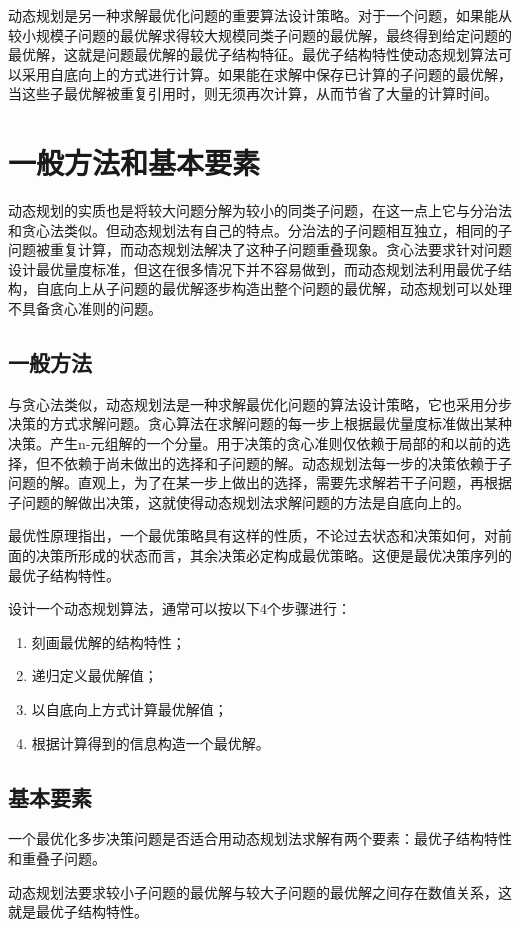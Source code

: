 动态规划是另一种求解最优化问题的重要算法设计策略。对于一个问题，如果能从较小规模子问题的最优解求得较大规模同类子问题的最优解，最终得到给定问题的最优解，这就是问题最优解的最优子结构特征。最优子结构特性使动态规划算法可以采用自底向上的方式进行计算。如果能在求解中保存已计算的子问题的最优解，当这些子最优解被重复引用时，则无须再次计算，从而节省了大量的计算时间。
\section{一般方法和基本要素}
动态规划的实质也是将较大问题分解为较小的同类子问题，在这一点上它与分治法和贪心法类似。但动态规划法有自己的特点。分治法的子问题相互独立，相同的子问题被重复计算，而动态规划法解决了这种子问题重叠现象。贪心法要求针对问题设计最优量度标准，但这在很多情况下并不容易做到，而动态规划法利用最优子结构，自底向上从子问题的最优解逐步构造出整个问题的最优解，动态规划可以处理不具备贪心准则的问题。
\subsection*{一般方法}
与贪心法类似，动态规划法是一种求解最优化问题的算法设计策略，它也采用分步决策的方式求解问题。贪心算法在求解问题的每一步上根据最优量度标准做出某种决策。产生n-元组解的一个分量。用于决策的贪心准则仅依赖于局部的和以前的选择，但不依赖于尚未做出的选择和子问题的解。动态规划法每一步的决策依赖于子问题的解。直观上，为了在某一步上做出的选择，需要先求解若干子问题，再根据子问题的解做出决策，这就使得动态规划法求解问题的方法是自底向上的。

最优性原理指出，一个最优策略具有这样的性质，不论过去状态和决策如何，对前面的决策所形成的状态而言，其余决策必定构成最优策略。这便是最优决策序列的最优子结构特性。

设计一个动态规划算法，通常可以按以下4个步骤进行：
\begin{enumerate}
	\item 刻画最优解的结构特性； 
	\item 递归定义最优解值； 
	\item 以自底向上方式计算最优解值； 
	\item 根据计算得到的信息构造一个最优解。
\end{enumerate}
\subsection*{基本要素}
一个最优化多步决策问题是否适合用动态规划法求解有两个要素：最优子结构特性和重叠子问题。

动态规划法要求较小子问题的最优解与较大子问题的最优解之间存在数值关系，这就是最优子结构特性。
